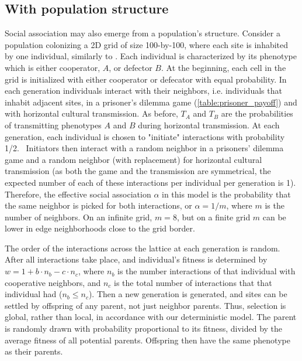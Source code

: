 \documentclass[12pt]{extarticle}
\begin{document}
{%
\subsection*{With population structure}

Social association may also emerge from a population's structure.
Consider a  population colonizing a 2D grid of size 100-by-100, where each site is inhabited by one individual, similarly to \citet{lewin2020rockpaperscissors}.
Each individual is characterized by its phenotype which is either cooperator, $A$, or defector $B$. At the beginning, each cell in the grid is initialized with either cooperator or defecator with equal probability.
In each generation individuals interact with their neighbors, i.e. individuals that inhabit adjacent sites, in a prisoner's dilemma game (\autoref{table:prisoner_payoff}) and with horizontal cultural transmission.
As before, $T_A$ and $T_B$ are the probabilities of transmitting phenotypes $A$ and $B$ during horizontal transmission.
At each generation, each individual is chosen to "initiate" interactions with probability 1/2.\ %
Initiators then interact with a random neighbor in a prisoners' dilemma game and a random neighbor (with replacement) for horizontal cultural transmission (as both the game and the transmission are symmetrical, the expected number of each of these interactions per individual per generation is 1).
Therefore, the effective social association $\alpha$ in this model is the probability that the same neighbor is picked for both interactions, or $\alpha=1/m$, where $m$ is the number of neighbors. On an infinite grid, $m=8$, but on a finite grid $m$ can be lower in edge neighborhoods close to the grid border.

The order of the interactions across the lattice at each generation is random.
After all interactions take place, and individual's fitness is determined by
$w = 1 + b \cdot n_b - c \cdot n_c$,
where $n_b$ is the number interactions of that individual with cooperative neighbors, and $n_c$ is the total number of interactions that that individual  had ($n_b \le n_c$).
Then a new generation is generated, and sites can be settled by offspring of any parent, not just neighbor parents. Thus, selection is global, rather than local, in accordance with our deterministic model.
The parent is randomly drawn with probability proportional to its fitness, divided by the average fitness of all potential parents.
Offspring then have the same phenotype as their parents.

}
\end{document}
